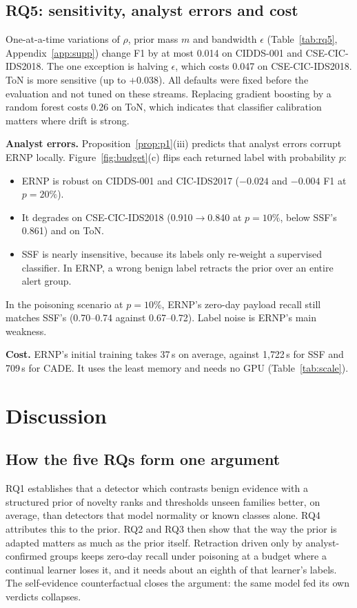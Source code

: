 \documentclass[a4paper,fleqn]{cas-dc}
\newcommand{\ERNP}{ERNP\xspace}
\begin{document}
\subsection{RQ5: sensitivity, analyst errors and cost}
\label{sec:rq5}
One-at-a-time variations of $\rho$, prior mass $m$ and bandwidth $\epsilon$ (Table~\ref{tab:rq5}, Appendix~\ref{app:supp}) change F1 by at most 0.014 on CIDDS-001 and CSE-CIC-IDS2018. The one exception is halving $\epsilon$, which costs 0.047 on CSE-CIC-IDS2018. ToN is more sensitive (up to $+0.038$). All defaults were fixed before the evaluation and not tuned on these streams. Replacing gradient boosting by a random forest costs 0.26 on ToN, which indicates that classifier calibration matters where drift is strong.

\textbf{Analyst errors.} Proposition~\ref{prop:p1}(iii) predicts that analyst errors corrupt \ERNP locally. Figure~\ref{fig:budget}(c) flips each returned label with probability $p$:
\begin{itemize}
  \item \ERNP is robust on CIDDS-001 and CIC-IDS2017 ($-0.024$ and $-0.004$ F1 at $p=20\%$).
  \item It degrades on CSE-CIC-IDS2018 (0.910$\rightarrow$0.840 at $p=10\%$, below SSF's 0.861) and on ToN.
  \item SSF is nearly insensitive, because its labels only re-weight a supervised classifier. In \ERNP, a wrong benign label retracts the prior over an entire alert group.
\end{itemize}
In the poisoning scenario at $p=10\%$, \ERNP's zero-day payload recall still matches SSF's (0.70--0.74 against 0.67--0.72). Label noise is \ERNP's main weakness.

\textbf{Cost.} \ERNP's initial training takes 37\,s on average, against 1{,}722\,s for SSF and 709\,s for CADE. It uses the least memory and needs no GPU (Table~\ref{tab:scale}).

\section{Discussion}
\label{sec:discussion}
\subsection{How the five RQs form one argument}
RQ1 establishes that a detector which contrasts benign evidence with a structured prior of novelty ranks and thresholds unseen families better, on average, than detectors that model normality or known classes alone. RQ4 attributes this to the prior. RQ2 and RQ3 then show that the way the prior is adapted matters as much as the prior itself. Retraction driven only by analyst-confirmed groups keeps zero-day recall under poisoning at a budget where a continual learner loses it, and it needs about an eighth of that learner's labels. The self-evidence counterfactual closes the argument: the same model fed its own verdicts collapses.
\end{document}
